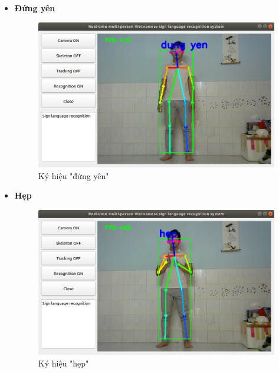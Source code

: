 \documentclass[12pt,a4paper,oneside]{book}
\numberwithin{equation}{chapter} %
\numberwithin{figure}{chapter} %
\numberwithin{table}{chapter} %
\begin{document}
\begin{itemize}
\item \textbf{Đứng yên}
\FloatBarrier
\begin{figure}[htp]
\begin{center}
\includegraphics[scale=0.4]{kq/dung_yen.png}
\end{center}
\caption{Ký hiệu "đứng yên"}
\end{figure}
\FloatBarrier

\item \textbf{Hẹp}
\FloatBarrier
\begin{figure}[htp]
\begin{center}
\includegraphics[scale=0.4]{kq/hep.png}
\end{center}
\caption{Ký hiệu "hẹp"}
\end{figure}
\FloatBarrier

\thispagestyle{phuluc}
\pagebreak


\end{itemize}
\end{document}
